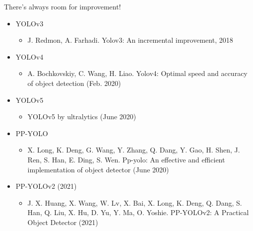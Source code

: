 \begin{frame}{There's always room for improvement!}
\begin{itemize}
    \item YOLOv3
    \begin{itemize}
        \item J. Redmon, A. Farhadi. Yolov3: An incremental improvement, 2018
    \end{itemize}
    \item YOLOv4
    \begin{itemize}
        \item A. Bochkovskiy, C. Wang, H. Liao. Yolov4: Optimal speed and accuracy of object detection (Feb. 2020)
    \end{itemize}
    \item YOLOv5
    \begin{itemize}
        \item YOLOv5 by ultralytics (June 2020)
    \end{itemize}
    \item PP-YOLO
    \begin{itemize}
        \item X. Long, K. Deng, G. Wang, Y. Zhang, Q. Dang, Y. Gao, H. Shen, J. Ren, S. Han, E. Ding, S. Wen. Pp-yolo: An effective and efficient implementation of object detector (June 2020)
    \end{itemize}
    \item PP-YOLOv2 (2021)
    \begin{itemize}
        \item J. X. Huang, X. Wang, W. Lv, X. Bai, X. Long, K. Deng, Q. Dang, S. Han, Q. Liu, X. Hu, D. Yu, Y. Ma, O. Yoshie. PP-YOLOv2: A Practical Object Detector (2021)
    \end{itemize}

\end{itemize}
    
\end{frame}